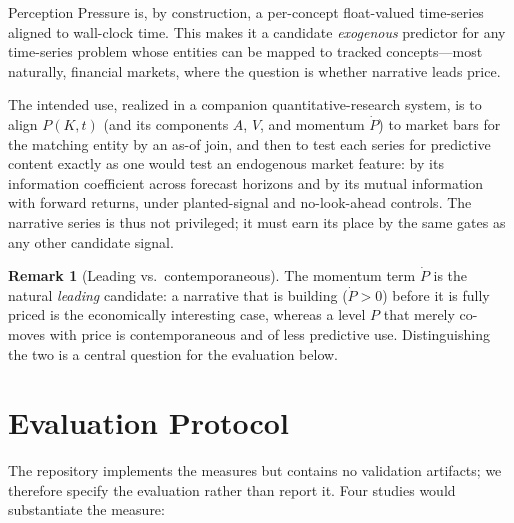 \documentclass[11pt,a4paper]{article}
\theoremstyle{definition}
\newtheorem{remark}{Remark}[section]
\begin{document}
Perception Pressure is, by construction, a per-concept float-valued time-series aligned to wall-clock
time. This makes it a candidate \emph{exogenous} predictor for any time-series problem whose entities
can be mapped to tracked concepts---most naturally, financial markets, where the question is whether
narrative leads price.

The intended use, realized in a companion quantitative-research system, is to align $P(K,t)$ (and its
components $A$, $V$, and momentum $\dot P$) to market bars for the matching entity by an as-of join,
and then to test each series for predictive content exactly as one would test an endogenous market
feature: by its information coefficient across forecast horizons and by its mutual information with
forward returns, under planted-signal and no-look-ahead controls. The narrative series is thus not
privileged; it must earn its place by the same gates as any other candidate signal.

\begin{remark}[Leading vs.\ contemporaneous]
\label{rem:leading}
The momentum term $\dot P$ is the natural \emph{leading} candidate: a narrative that is building
($\dot P > 0$) before it is fully priced is the economically interesting case, whereas a level $P$
that merely co-moves with price is contemporaneous and of less predictive use. Distinguishing the two
is a central question for the evaluation below.
\end{remark}

\section{Evaluation Protocol}
\label{sec:eval}

The repository implements the measures but contains no validation artifacts; we therefore specify the
evaluation rather than report it. Four studies would substantiate the measure:
\end{document}
